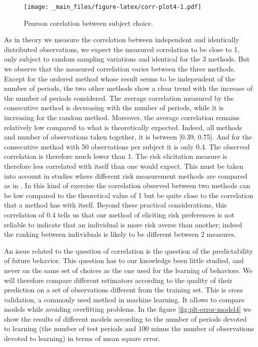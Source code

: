 \documentclass[
]{book}
\begin{document}
\begin{figure}
\centering
\texttt{[image: \_main\_files/figure-latex/corr-plot4-1.pdf]}
\caption{\label{fig:corr-plot4}Pearson corelation between subject choice.}
\end{figure}

As in theory we measure the correlation between independent and
identically distributed observations, we expect the measured correlation
to be close to 1, only subject to random sampling variations and
identical for the 3 methods.
But we observe that the measured
correlation varies between the three methods. Except for the ordered
method whose result seems to be independent of the number of periods,
the two other methods show a clear trend with the increase of the number
of periods considered. The average correlation measured by the consecutive method
is decreasing with the number of periods, while it is increasing for the
random method. Moreover, the average correlation remains relatively low
compared to what is theoretically expected. Indeed, all methods and
number of observations taken together, it is between
{[}0.39, 0.75{]}. And
for the consecutive method with 50 observations per subject it is only
0.4.
The observed correlation is therefore much lower than 1.
The risk elicitation measure is therefore less correlated with itself than one
would expect.
This must be taken into account in studies where different risk measurement
methods are compared as in \citet{crosetto2016theoretical}.
In this kind of exercise the correlation observed between two methods can be low
compared to the theoretical value of 1 but be quite close to the correlation
that a method has with itself.
Beyond these practical considerations, this correlation of
0.4
tells us that our method of eliciting risk preferences is not reliable to
indicate that an individual is more risk averse than another;
indeed the ranking between individuals is likely to be different between 2
measures.

An issue related to the question of correlation is the question of the
predictability of future behavior.
This question has to our knowledge been little studied, and never on the same
set of choices as the one used for the learning of behaviors.
We will therefore compare different estimators according to the quality of their
prediction on a set of observations different from the training set.
This is cross validation, a commonly used method in machine learning.
It allows to compare models while avoiding overfitting problems.
In the figure \ref{fig:plt-error-model4} we show the
results of different models according to the number of periods devoted
to learning (the number of test periods and 100 minus the number of
observations devoted to learning) in terms of mean square error.
\end{document}
